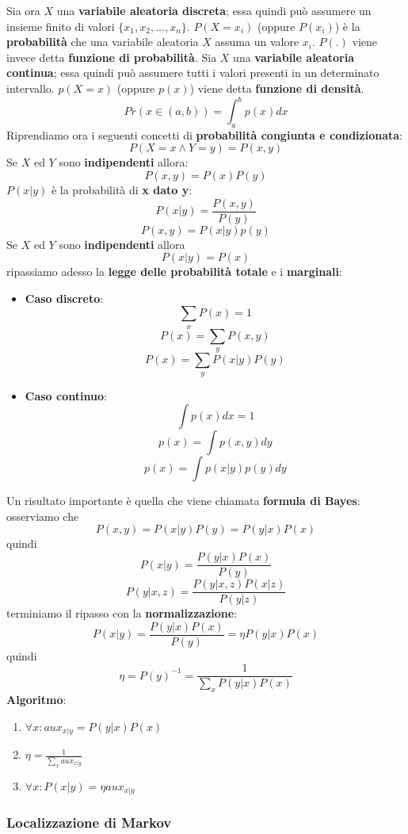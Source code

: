 \documentclass[12pt]{article}
\begin{document}
Sia ora $X$ una \textbf{variabile aleatoria discreta}; essa quindi può
assumere un insieme finito di valori $\{x_1, x_2, ..., x_n\}$.
$P(X = x_i)$ (oppure $P(x_i)$) è la \textbf{probabilità} che una variabile aleatoria
$X$ assuma un valore $x_i$. $P(.)$ viene invece detta \textbf{funzione di probabilità}. \newline
Sia $X$ una \textbf{variabile aleatoria continua}; essa quindi può assumere
tutti i valori presenti in un determinato intervallo. $p(X = x)$ (oppure $p(x)$) viene detta \textbf{funzione di densità}.
$$Pr(x \in (a,b)) = \int_{a}^b p(x) dx$$
Riprendiamo ora i seguenti concetti di \textbf{probabilità congiunta e condizionata}:
$$P(X = x \land Y = y) = P(x,y)$$
Se $X$ ed $Y$ sono \textbf{indipendenti} allora:
$$P(x,y) = P(x)P(y)$$
$P(x|y)$ è la probabilità di \textbf{x dato y}:
$$P(x|y) = \frac{P(x,y)}{P(y)}$$
$$P(x,y) = P(x|y)p(y)$$
Se $X$ ed $Y$ sono \textbf{indipendenti} allora
$$P(x|y) = P(x)$$
ripassiamo adesso la \textbf{legge delle probabilità totale} e i \textbf{marginali}:
\begin{itemize}
    \item \textbf{Caso discreto}:
    $$\sum_{x}P(x) = 1$$
    $$P(x) = \sum_{y}P(x,y)$$
    $$P(x) = \sum_{y}P(x|y)P(y)$$
    \item \textbf{Caso continuo}:
    $$\int p(x)dx = 1$$
    $$p(x) = \int p(x,y) dy$$
    $$p(x) = \int p(x|y)p(y)dy$$
\end{itemize}
Un risultato importante è quella che viene chiamata \textbf{formula di Bayes}: osserviamo che
$$P(x,y) = P(x|y)P(y) = P(y|x)P(x)$$
quindi
$$P(x|y) = \frac{P(y|x)P(x)}{P(y)}$$
$$P(y|x,z) =\frac{P(y|x,z)P(x|z)}{P(y|z)}$$
terminiamo il ripasso con la \textbf{normalizzazione}:
$$P(x|y) = \frac{P(y|x)P(x)}{P(y)} = \eta P(y|x)P(x)$$
quindi
$$\eta = P(y)^{-1} = \frac{1}{\sum_x P(y|x)P(x)}$$
\textbf{Algoritmo}:
\begin{enumerate}
    \item $\forall x: aux_{x|y} = P(y|x)P(x)$
    \item $\eta = \frac{1}{\sum_{x}aux_{x|y}}$
    \item $\forall x: P(x|y) = \eta aux_{x|y}$
\end{enumerate}
\subsubsection{Localizzazione di Markov}
\end{document}
